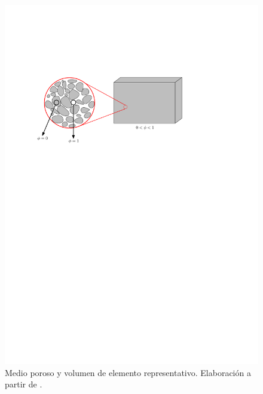 \begin{figure}[h]
	\centering%
	\includegraphics[scale=0.8]{Fig/porous_media.pdf}%
	\caption[Medio poroso y volumen de elemento representativo.]{Medio poroso y volumen de elemento representativo. Elaboración a partir de \cite{Bear2018}.} \label{fig:medioporoso}
\end{figure}

